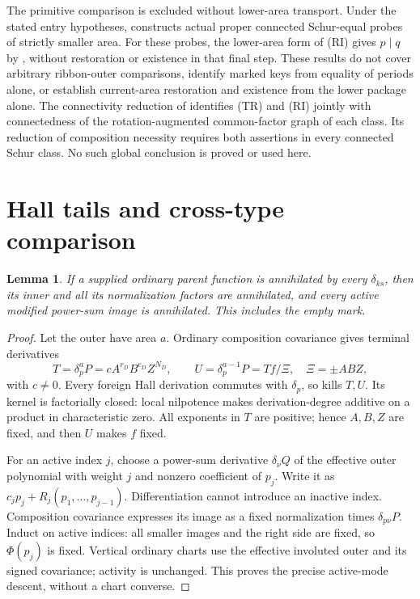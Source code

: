 \documentclass[11pt,a4paper]{amsart}
\numberwithin{equation}{section}
\theoremstyle{plain}
\newtheorem{lemma}[theorem]{Lemma}
\theoremstyle{definition}
\begin{document}
The primitive comparison is excluded without lower-area transport.  Under the stated entry hypotheses,  constructs actual proper connected Schur-equal probes of strictly smaller area.  For these probes, the lower-area form of (RI) gives \(p\mid q\) by , without restoration or existence in that final step.  These results do not cover arbitrary ribbon-outer comparisons, identify marked keys from equality of periods alone, or establish current-area restoration and existence from the lower package alone.  The connectivity reduction of \cite{Shields2026Gluing} identifies (TR) and (RI) jointly with connectedness of the rotation-augmented common-factor graph of each class.  Its reduction of composition necessity requires both assertions in every connected Schur class.  No such global conclusion is proved or used here.

\appendix
\section{Hall tails and cross-type comparison}\label{sec:cross}
\begin{lemma}\label{lem:active-descent}
If a supplied ordinary parent function is annihilated by every \(\delta_{ks}\), then its inner and all its normalization factors are annihilated, and every active modified power-sum image is annihilated.  This includes the empty mark.
\end{lemma}
\begin{proof}
Let the outer have area \(a\).  Ordinary composition covariance gives terminal derivatives
\[
 T=\delta_p^aP=c A^{r_D}B^{c_D}Z^{N_D},\qquad
 U=\delta_p^{a-1}P=T f/\Xi,\quad\Xi=\pm ABZ,
\]
with \(c\ne0\).  Every foreign Hall derivation commutes with \(\delta_p\), so kills \(T,U\).  Its kernel is factorially closed: local nilpotence makes derivation-degree additive on a product in characteristic zero.  All exponents in \(T\) are positive; hence \(A,B,Z\) are fixed, and then \(U\) makes \(f\) fixed.

For an active index \(j\), choose a power-sum derivative \(\delta_\nu Q\) of the effective outer polynomial with weight \(j\) and nonzero coefficient of \(p_j\).  Write it as \(c_jp_j+R_j(p_1,\ldots,p_{j-1})\).  Differentiation cannot introduce an inactive index.  Composition covariance expresses its image as a fixed normalization times \(\delta_{p\nu}P\).  Induct on active indices: all smaller images and the right side are fixed, so \(\Phi(p_j)\) is fixed.  Vertical ordinary charts use the effective involuted outer and its signed covariance; activity is unchanged.  This proves the precise active-mode descent, without a chart converse.
\end{proof}
\end{document}

